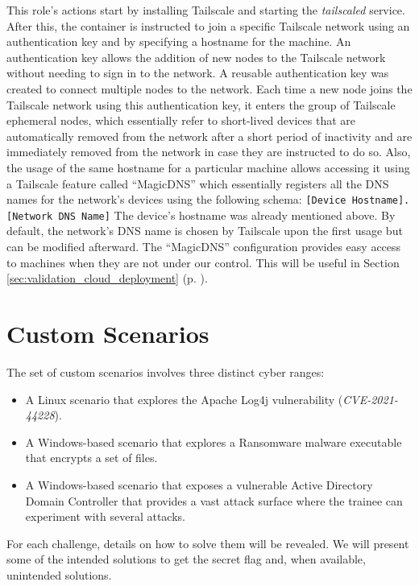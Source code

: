This role's actions start by installing Tailscale and starting the \textit{tailscaled} service. After this, the container is instructed to join a specific Tailscale network using an authentication key and by specifying a hostname for the machine. An authentication key allows the addition of new nodes to the Tailscale network without needing to sign in to the network. A reusable authentication key was created to connect multiple nodes to the network. Each time a new node joins the Tailscale network using this authentication key, it enters the group of Tailscale ephemeral nodes, which essentially refer to short-lived devices that are automatically removed from the network after a short period of inactivity and are immediately removed from the network in case they are instructed to do so. Also, the usage of the same hostname for a particular machine allows accessing it using a Tailscale feature called ``MagicDNS'' which essentially registers all the DNS names for the network's devices using the following schema: \texttt{[Device Hostname].[Network DNS Name]}
The device's hostname was already mentioned above. By default, the network's DNS name is chosen by Tailscale upon the first usage but can be modified afterward. The ``MagicDNS'' configuration provides easy access to machines when they are not under our control. This will be useful in Section \ref{sec:validation_cloud_deployment} (p. \pageref{sec:validation_cloud_deployment}).

\section{Custom Scenarios} \label{sec:validation_custom_scenarios}

The set of custom scenarios involves three distinct cyber ranges:

\begin{itemize}
    \item A Linux scenario that explores the Apache Log4j vulnerability (\textit{CVE-2021-44228}).
    \item A Windows-based scenario that explores a Ransomware malware executable that encrypts a set of files.
    \item A Windows-based scenario that exposes a vulnerable Active Directory Domain Controller that provides a vast attack surface where the trainee can experiment with several attacks. 
\end{itemize}

For each challenge, details on how to solve them will be revealed. We will present some of the intended solutions to get the secret flag and, when available, unintended solutions.

